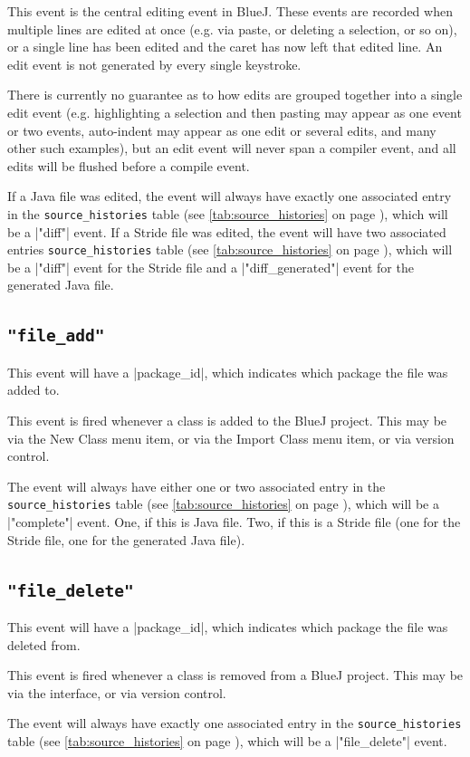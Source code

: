 \documentclass{report}
\newcommand{\myref}[1]{\autoref{#1} on page \pageref*{#1}}
\newcommand{\tabref}[1]{\lstinline|#1| table (see \myref{tab:#1})}
\begin{document}
This event is the central editing event in BlueJ.  These events are recorded
when multiple lines are edited at once (e.g. via paste, or deleting a
selection, or so on), or a single line has been edited and the caret
has now left that edited line.  An edit event is not generated by every single
keystroke.

There is currently no guarantee as to how edits are grouped together into a single edit
event (e.g. highlighting a selection and then pasting may appear as one event
or two events, auto-indent may appear as one edit or several edits, and many
other such examples), but an edit event will never span a compiler event, and
all edits will be flushed before a compile event.

If a Java file was edited, the event will always have exactly one associated entry in the
\tabref{source_histories}, which will be a |"diff"| event.  If a Stride file was edited,
the event will have two associated entries \tabref{source_histories}, which will be a |"diff"| event
for the Stride file and a |"diff_generated"| event for the generated Java file.

\subsection{\lstinline!"file_add"!}

This event will have a |package_id|, which indicates which package the file
was added to.

This event is fired whenever a class is added to the BlueJ project.  This may
be via the New Class menu item, or via the Import Class menu item, or via
version control.

The event will always have either one or two associated entry in the
\tabref{source_histories}, which will be a |"complete"| event.  One, if this
is Java file.  Two, if this is a Stride file (one for the Stride file, one
for the generated Java file).

\subsection{\lstinline!"file_delete"!}

This event will have a |package_id|, which indicates which package the file
was deleted from.

This event is fired whenever a class is removed from a BlueJ project.  This
may be via the interface, or via version control.

The event will always have exactly one associated entry in the
\tabref{source_histories}, which will be a |"file_delete"| event.
\end{document}
